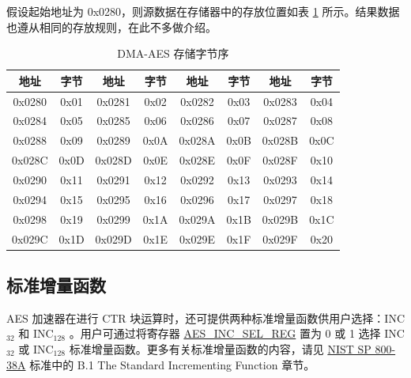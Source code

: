\documentclass[main\_\_CN.tex]{subfiles}
\begin{document}
假设起始地址为 0x0280，则源数据在存储器中的存放位置如表 \ref{tab:aes-dma-aes-plaintext-ciphertext-endian} 所示。结果数据也遵从相同的存放规则，在此不多做介绍。

\begin{longtable}[c]
{ |c|c|c|c|c|c|c|c|}
\caption{DMA-AES 存储字节序} 
\label{tab:aes-dma-aes-plaintext-ciphertext-endian}\\
\hline 
\rowcolor{lightgray}
\textbf{地址} &  \textbf{字节}  & \textbf{地址} &  \textbf{字节}  & \textbf{地址} &  \textbf{字节}  & \textbf{地址} &  \textbf{字节} \\\hline
0x0280 & 0x01 & 0x0281 & 0x02 & 0x0282 & 0x03 & 0x0283 & 0x04 \\\hline 
0x0284 & 0x05 & 0x0285 & 0x06 & 0x0286 & 0x07 & 0x0287 & 0x08 \\\hline 
0x0288 & 0x09 & 0x0289 & 0x0A & 0x028A & 0x0B & 0x028B & 0x0C \\\hline 
0x028C & 0x0D & 0x028D & 0x0E & 0x028E & 0x0F & 0x028F & 0x10 \\\hline 
0x0290 & 0x11 & 0x0291 & 0x12 & 0x0292 & 0x13 & 0x0293 & 0x14 \\\hline 
0x0294 & 0x15 & 0x0295 & 0x16 & 0x0296 & 0x17 & 0x0297 & 0x18 \\\hline 
0x0298 & 0x19 & 0x0299 & 0x1A & 0x029A & 0x1B & 0x029B & 0x1C \\\hline 
0x029C & 0x1D & 0x029D & 0x1E & 0x029E & 0x1F & 0x029F & 0x20 \\\hline  
\end{longtable}

\subsection{标准增量函数}\label{sec:aes-Standard-Incrementing-Function}

AES 加速器在进行 CTR 块运算时，还可提供两种标准增量函数供用户选择：INC$_{32}$ 和 INC$_{128}$ 。用户可通过将寄存器 \hyperref[regdesc:AESINCSELREG]{AES\_INC\_SEL\_REG} 置为 0 或 1 选择 INC$_{32}$ 或 INC$_{128}$ 标准增量函数。更多有关标准增量函数的内容，请见 \href{https://nvlpubs.nist.gov/nistpubs/Legacy/SP/nistspecialpublication800-38a.pdf}{NIST SP 800-38A} 标准中的 B.1 The Standard Incrementing Function 章节。

\end{document}
